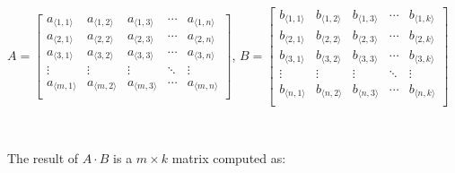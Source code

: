 \begin{tcolorbox}[title={\textbf{\tboxdef{\ref*{subsec:matrix-arithmetic}} Matrix Arithmetic}}]
\begin{itemize}
$A = \begin{bmatrix}
 a_{\langle 1, 1\rangle} & a_{\langle 1, 2\rangle} & a_{\langle 1, 3\rangle} & \cdots & a_{\langle 1, n\rangle}\\
 a_{\langle 2, 1\rangle} & a_{\langle 2, 2\rangle} & a_{\langle 2, 3\rangle} & \cdots & a_{\langle 2, n\rangle} \\
 a_{\langle 3, 1\rangle} & a_{\langle 3, 2\rangle} & a_{\langle 3, 3\rangle} & \cdots & a_{\langle 3, n\rangle} \\
\vdots & \vdots & \vdots & \ddots & \vdots \\
 a_{\langle m, 1\rangle} & a_{\langle m, 2\rangle} & a_{\langle m, 3\rangle} & \cdots & a_{\langle m, n\rangle} \\
\end{bmatrix}$, $B = \begin{bmatrix}
 b_{\langle 1, 1\rangle} & b_{\langle 1, 2\rangle} & b_{\langle 1, 3\rangle} & \cdots & b_{\langle 1, k\rangle}\\
 b_{\langle 2, 1\rangle} & b_{\langle 2, 2\rangle} & b_{\langle 2, 3\rangle} & \cdots & b_{\langle 2, k\rangle} \\
 b_{\langle 3, 1\rangle} & b_{\langle 3, 2\rangle} & b_{\langle 3, 3\rangle} & \cdots & b_{\langle 3, k\rangle} \\
\vdots & \vdots & \vdots & \ddots & \vdots \\
 b_{\langle n, 1\rangle} & b_{\langle n, 2\rangle} & b_{\langle n, 3\rangle} & \cdots & b_{\langle n, k\rangle} \\
\end{bmatrix}$

$ $

The result of $A \cdot B$ is a $m \times k$ matrix computed as:


\end{itemize}
\end{tcolorbox}
